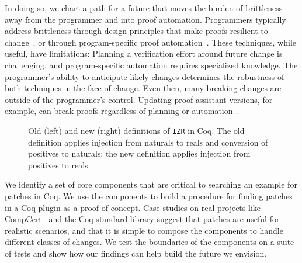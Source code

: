 In doing so, we chart a path for a future %
that moves the burden of brittleness
away from the programmer and into proof automation. 
Programmers typically address brittleness through design principles that make proofs
resilient to change~\cite{proof-eng, Aydemir2008, Delaware2013ICFP}, or through program-specific proof automation~\cite{chlipala:cpdt}.
These techniques, while useful, have limitations: 
Planning a verification effort around future change is challenging, and program-specific automation requires specialized knowledge.
The programmer's ability to anticipate likely changes determines the robustness of both techniques in
the face of change. %
Even then, many breaking changes are outside of the programmer's control. Updating proof assistant
versions, for example, can break proofs regardless of planning or automation~\cite{verdicommit}.

\begin{figure*}[ht]
\begin{minipage}{0.48\textwidth}
\centering
\lstset{language=coq, aboveskip=0pt, belowskip=0pt}



\end{minipage}
\hfill
\begin{minipage}{0.48\textwidth}
\centering
\lstset{language=coq, aboveskip=0pt, belowskip=0pt}



\end{minipage}
\vspace{-.3cm}
\caption[Caption]{Old (left) and new (right) definitions of \lstinline{IZR} in Coq.
The old definition applies injection from naturals to reals and conversion of positives to
naturals; the new definition applies injection from positives to reals.}
\label{fig:izr}
\end{figure*}


We identify a set of core components that are critical to searching an example for patches in Coq.
We use the components to build %
a procedure for finding patches %
in a Coq plugin as a 
proof-of-concept.
Case studies on real projects like CompCert~\cite{leroy:compcert} and the Coq standard library
suggest that patches are useful for realistic scenarios, and that it is simple to compose the components 
to handle different classes of changes.
We test the boundaries of the components on a suite of tests
and show how our findings can help build the future we envision.

